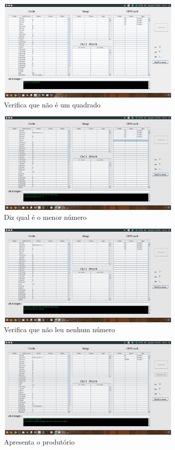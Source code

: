 \documentclass{report}
\begin{document}
\begin{figure}[h]
	\centering
	\includegraphics[width=9cm,height= 5cm]{exemplo1-2.png}
	\caption{Verifica que não é um quadrado}
	\label{Exemplo 1.2}
\end{figure}

\begin{figure}[h]
	\centering
	\includegraphics[width=9cm,height= 5cm]{exemplo2-1.png}
	\caption{Diz qual é o menor número}
	\label{Exemplo 2.1}
\end{figure}

\begin{figure}[h]
	\centering
	\includegraphics[width=9cm,height= 5cm]{exemplo2-2.png}
	\caption{Verifica que não leu nenhum número}
	\label{Exemplo 2.2}
\end{figure}

\begin{figure}[h]
	\centering
	\includegraphics[width=9cm,height= 5cm]{exemplo3-1.png}
	\caption{Apresenta o produtório}
	\label{Exemplo 3.1}
\end{figure}
\end{document}
